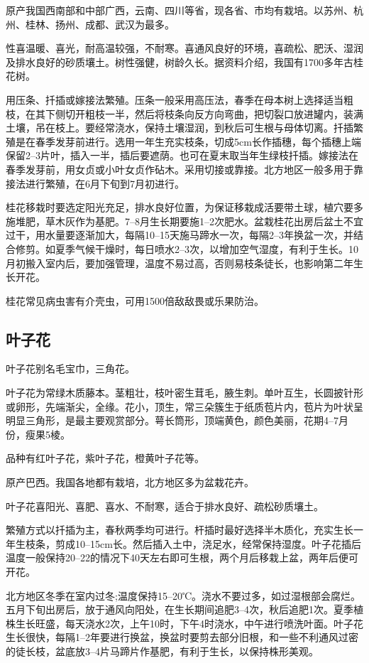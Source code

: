 \documentclass{ctexbook}
\begin{document}
原产我国西南部和中部广西，云南、四川等省，现各省、市均有栽培。以苏州、杭州、桂林、扬州、成都、武汉为最多。

性喜温暖、喜光，耐高温较强，不耐寒。喜通风良好的环境，喜疏松、肥沃、湿润及排水良好的砂质壤土。树性强健，树龄久长。据资料介绍，我国有1700多年古桂花树。

用压条、扦插或嫁接法繁殖。压条一般采用高压法，春季在母本树上选择适当粗枝，在其下侧切开粗枝一半，然后将枝条向反方向弯曲，把切裂口放进罐内，装满土壤，吊在枝上。要经常浇水，保持土壤湿润，到秋后可生根与母体切离。扦插繁殖是在春季发芽前进行。选用一年生充实枝条，切成5cm长作插穗，每个插穗上端保留2--3片叶，插入一半，插后要遮荫。也可在夏末取当年生绿枝扦插。嫁接法在春季发芽前，用女贞或小叶女贞作砧木。采用切接或靠接。北方地区一般多用于靠接法进行繁殖，在6月下旬到7月初进行。

桂花移栽时要选定阳光充足，排水良好位置，为保证移栽成活要带土球，植穴要多施堆肥，草木灰作为基肥。7--8月生长期要施1--2次肥水。盆栽桂花出房后盆土不宜过干，用水量要逐渐加大，每隔10--15天施马蹄水一次，每隔2--3年换盆一次，并结合修剪。如夏季气候干燥时，每日喷水2--3次，以增加空气湿度，有利于生长。10月初搬入室内后，要加强管理，温度不易过高，否则易枝条徒长，也影响第二年生长开花。

桂花常见病虫害有介壳虫，可用1500倍敌敌畏或乐果防治。
\subsection{叶子花}
叶子花别名毛宝巾，三角花。

叶子花为常绿木质藤本。茎粗壮，枝叶密生茸毛，腋生刺。单叶互生，长圆披针形或卵形，先端渐尖，全缘。花小，顶生，常三朵簇生于纸质苞片内，苞片为叶状呈明显三角形，是最主要观赏部分。萼长筒形，顶端黄色，颜色美丽，花期4--7月份，瘦果5棱。

品种有红叶子花，紫叶子花，橙黄叶子花等。

原产巴西。我国各地都有栽培，北方地区多为盆栽花卉。

叶子花喜阳光、喜肥、喜水、不耐寒，适合于排水良好、疏松砂质壤土。

繁殖方式以扦插为主，春秋两季均可进行。杆插时最好选择半木质化，充实生长一年生枝条，剪成10--15cm长。然后插入土中，浇足水，经常保持湿度。叶子花插后温度一般保持20--22的情况下40天左右即可生根，两个月后移栽上盆，两年后便可开花。

北方地区冬季在室内过冬;温度保持15--20℃。浇水不要过多，如过湿根部会腐烂。五月下旬出房后，放于通风向阳处，在生长期间追肥3--4次，秋后追肥1次。夏季植株生长旺盛，每天浇水2次，上午10时，下午4时浇水，中午进行喷洗叶面。叶子花生长很快，每隔1--2年要进行换盆，换盆时要剪去部分旧根，和一些不利通风过密的徒长枝，盆底放3--4片马蹄片作基肥，有利于生长，以保持株形美观。
\end{document}
